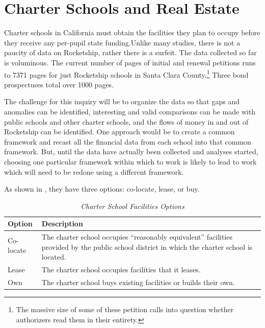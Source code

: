 \section{Charter Schools and Real Estate}\label{sec:real-estate}\indent

Charter schools in California must obtain the facilities they plan to occupy before they receive any per-pupil state funding.Unlike many studies, there is not a paucity of data on Rocketship, rather there is a surfeit. The data collected so far is voluminous. The current number of pages of initial and renewal petitions runs to 7371 pages for just Rocketship schools in Santa Clara County.\footnote{The massive size of some of these petition calls into question whether authorizers read them in their entirety.} Three bond prospectuses total over 1000 pages. 

The challenge for this inquiry will be to organize the data so that gaps and anomalies can be identified, interesting and valid comparisons can be made with public schools and other charter schools, and the flows of money in and out of Rocketship can be identified. One approach would be to create a common framework and recast all the financial data from each school into that common framework. But, until the data have actually been collected and analyses started, choosing one particular framework within which to work is likely to lead to work which will need to be redone using a different framework.

 As shown in , they have three options: co-locate, lease, or buy.

\begin{table}[ht]
  \small%
  \caption[Charter School Facilities Options]{\textit{Charter School Facilities Options}}\label{tab:charter-facilities-options}%
  \begin{tabular}{ll}
    \toprule%
    Option    & Description \\
    \midrule%
    Co-locate & \multirow[t]{2}{4.75in}{The charter school occupies ``reasonably equivalent'' facilities provided by 
    the public school district in which the charter school is located.}\\\\
    Lease     & The charter school occupies facilities that it leases.\\
    Own       & The charter school buys existing facilities or builds their own. \\
    \bottomrule%
  \end{tabular}
\end{table}

